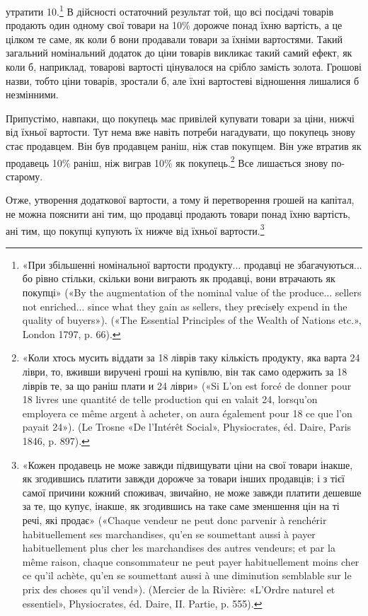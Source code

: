 \parcont{}  %
утратити 10.\footnote{
«При збільшенні номінальної вартости продукту... продавці не
збагачуються... бо рівно стільки, скільки вони виграють як продавці,
вони втрачають як покупці» («By the augmentation of the nominal value
of the produce... sellers not enriched... since what they gain as sellers, they
prеcisеly expend in the quality of buyers»). («The Essential Principles of
the Wealth of Nations etc.», London 1797, p. 66).
} В дійсності остаточний результат той, що всі посідачі
товарів продають один одному свої товари на 10\% дорожче
понад їхню вартість, а це цілком те саме, як коли б вони продавали
товари за їхніми вартостями. Такий загальний номінальний
додаток до ціни товарів викликає такий самий ефект, як коли б,
наприклад, товарові вартості цінувалося на срібло замість золота.
Грошові назви, тобто ціни товарів, зростали б, але їхні
вартостеві відношення лишалися б незмінними.

Припустімо, навпаки, що покупець має привілей купувати
товари за ціни, нижчі від їхньої вартости. Тут нема вже навіть
потреби нагадувати, що покупець знову стає продавцем. Він
був продавцем раніш, ніж став покупцем. Він уже втратив як
продавець 10\% раніш, ніж виграв 10\% як покупець.\footnote{
«Коли хтось мусить віддати за 18 ліврів таку кількість продукту,
яка варта 24 ліври, то, вживши виручені гроші на купівлю, він так само
одержить за 18 ліврів те, за що раніш плати и 24 ліври» («Si L’on est
forcé de donner pour 18 livres une quantité de telle production qui en valait
24, lorsqu’on employera ce même argent à acheter, on aura également pour
18 ce que l’on payait 24»). (Le Trosne «De l’Intérêt Social»,
Physiocrates, éd. Daire, Paris 1846, p. 897).
}  Все лишається
знову по-старому.

Отже, утворення додаткової вартости, а тому й перетворення
грошей на капітал, не можна пояснити ані тим, що продавці
продають товари понад їхню вартість, ані тим, що покупці купують
їх нижче від їхньої вартости.\footnote{
«Кожен продавець не може завжди підвищувати ціни на свої товари
інакше, як згодившись платити завжди дорожче за товари інших продавців;
і з тієї самої причини кожний споживач, звичайно, не може завжди
платити дешевше за те, що купує, інакше, як згодившись на таке саме зменшення
цін на ті речі, які продає» («Chaque vendeur ne peut donc parvenir
à renchérir habituellement ses marchandises, qu’en se soumettant aussi à
payer habituellement plus cher les marchandises des autres vendeurs; et
par la même raison, chaque consommateur ne peut payer habituellement
moins cher ce qu’il achète, qu’en se soumettant aussi à une diminution
semblable sur le prix des choses qu’il vend»). (Mercier de la Rivière:
«L’Ordre naturel et essentiel», Physiocrates, éd. Daire, II. Partie, p. 555).
}

